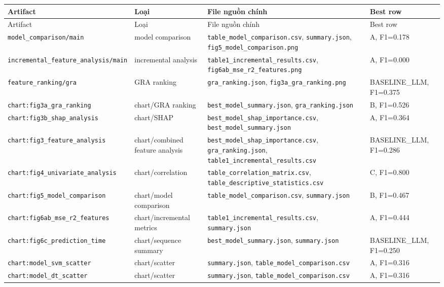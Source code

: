 \documentclass[11pt,a4paper]{article}
\newcommand{\field}[1]{\texttt{#1}}
\begin{document}
\small
\begin{longtable}{>{\raggedright\arraybackslash}p{4.4cm} >{\raggedright\arraybackslash}p{3.4cm} >{\raggedright\arraybackslash}p{4.8cm} >{\raggedright\arraybackslash}p{2.2cm}}
\toprule
Artifact & Loại & File nguồn chính & Best row \\
\midrule
\endfirsthead
\toprule
Artifact & Loại & File nguồn chính & Best row \\
\midrule
\endhead
\field{model\_comparison/main} & model comparison & \field{table\_model\_comparison.csv}, \field{summary.json}, \field{fig5\_model\_comparison.png} & A, F1=0.178 \\
\field{incremental\_feature\_analysis/main} & incremental analysis & \field{table1\_incremental\_results.csv}, \field{fig6ab\_mse\_r2\_features.png} & A, F1=0.000 \\
\field{feature\_ranking/gra} & GRA ranking & \field{gra\_ranking.json}, \field{fig3a\_gra\_ranking.png} & BASELINE\_LLM, F1=0.375 \\
\field{chart:fig3a\_gra\_ranking} & chart/GRA ranking & \field{best\_model\_summary.json}, \field{gra\_ranking.json} & B, F1=0.526 \\
\field{chart:fig3b\_shap\_analysis} & chart/SHAP & \field{best\_model\_shap\_importance.csv}, \field{best\_model\_summary.json} & A, F1=0.364 \\
\field{chart:fig3\_feature\_analysis} & chart/combined feature analysis & \field{best\_model\_shap\_importance.csv}, \field{gra\_ranking.json}, \field{table1\_incremental\_results.csv} & BASELINE\_LLM, F1=0.286 \\
\field{chart:fig4\_univariate\_analysis} & chart/correlation & \field{table\_correlation\_matrix.csv}, \field{table\_descriptive\_statistics.csv} & C, F1=0.800 \\
\field{chart:fig5\_model\_comparison} & chart/model comparison & \field{table\_model\_comparison.csv}, \field{summary.json} & B, F1=0.467 \\
\field{chart:fig6ab\_mse\_r2\_features} & chart/incremental metrics & \field{table1\_incremental\_results.csv}, \field{summary.json} & A, F1=0.444 \\
\field{chart:fig6c\_prediction\_time} & chart/sequence summary & \field{best\_model\_summary.json}, \field{summary.json} & BASELINE\_LLM, F1=0.250 \\
\field{chart:model\_svm\_scatter} & chart/scatter & \field{summary.json}, \field{table\_model\_comparison.csv} & A, F1=0.316 \\
\field{chart:model\_dt\_scatter} & chart/scatter & \field{summary.json}, \field{table\_model\_comparison.csv} & A, F1=0.316 \\

\end{longtable}
\end{document}
